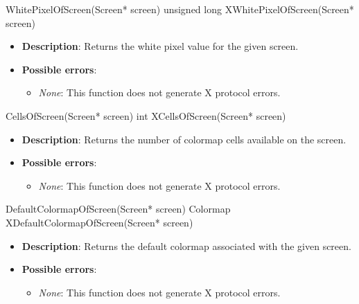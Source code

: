 \documentclass{report}
\begin{document}
\begin{itemize}
        \begin{cppcode}
            WhitePixelOfScreen(Screen* screen)
            unsigned long XWhitePixelOfScreen(Screen* screen)
        \end{cppcode}
        \begin{itemize}
            \item \textbf{Description}: Returns the white pixel value for the given screen.
            \item \textbf{Possible errors}:
                \begin{itemize}
                    \item \textit{None}: This function does not generate X protocol errors.
                \end{itemize}
        \end{itemize}

        \begin{cppcode}
            CellsOfScreen(Screen* screen)
            int XCellsOfScreen(Screen* screen)
        \end{cppcode}
        \begin{itemize}
            \item \textbf{Description}: Returns the number of colormap cells available on the screen.
            \item \textbf{Possible errors}:
                \begin{itemize}
                    \item \textit{None}: This function does not generate X protocol errors.
                \end{itemize}
        \end{itemize}

        \begin{cppcode}
            DefaultColormapOfScreen(Screen* screen)
            Colormap XDefaultColormapOfScreen(Screen* screen)
        \end{cppcode}
        \begin{itemize}
            \item \textbf{Description}: Returns the default colormap associated with the given screen.
            \item \textbf{Possible errors}:
                \begin{itemize}
                    \item \textit{None}: This function does not generate X protocol errors.
                \end{itemize}
        \end{itemize}


\end{itemize}
\end{document}
